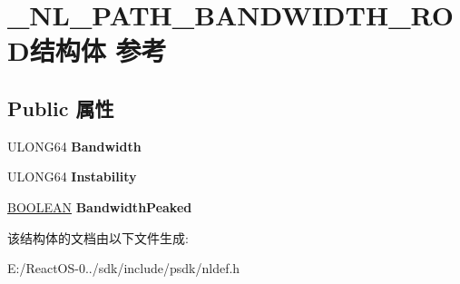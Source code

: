 \hypertarget{struct___n_l___p_a_t_h___b_a_n_d_w_i_d_t_h___r_o_d}{}\section{\+\_\+\+N\+L\+\_\+\+P\+A\+T\+H\+\_\+\+B\+A\+N\+D\+W\+I\+D\+T\+H\+\_\+\+R\+O\+D结构体 参考}
\label{struct___n_l___p_a_t_h___b_a_n_d_w_i_d_t_h___r_o_d}
\subsection*{Public 属性}
\begin{DoxyCompactItemize}
\item 
\mbox{\label{struct___n_l___p_a_t_h___b_a_n_d_w_i_d_t_h___r_o_d_a9e6f56b7847f613d09ae18f0ca4a0471}} 
U\+L\+O\+N\+G64 {\bfseries Bandwidth}
\item 
\mbox{\label{struct___n_l___p_a_t_h___b_a_n_d_w_i_d_t_h___r_o_d_ae9202aa6847cc14ea7267d8b4538b550}} 
U\+L\+O\+N\+G64 {\bfseries Instability}
\item 
\mbox{\label{struct___n_l___p_a_t_h___b_a_n_d_w_i_d_t_h___r_o_d_a7fd136e89e8ef8db4f8c6f29b010ad7b}} 
\hyperlink{_processor_bind_8h_a112e3146cb38b6ee95e64d85842e380a}{B\+O\+O\+L\+E\+AN} {\bfseries Bandwidth\+Peaked}
\end{DoxyCompactItemize}


该结构体的文档由以下文件生成\+:\begin{DoxyCompactItemize}
\item 
E\+:/\+React\+O\+S-\/0../sdk/include/psdk/nldef.\+h\end{DoxyCompactItemize}
